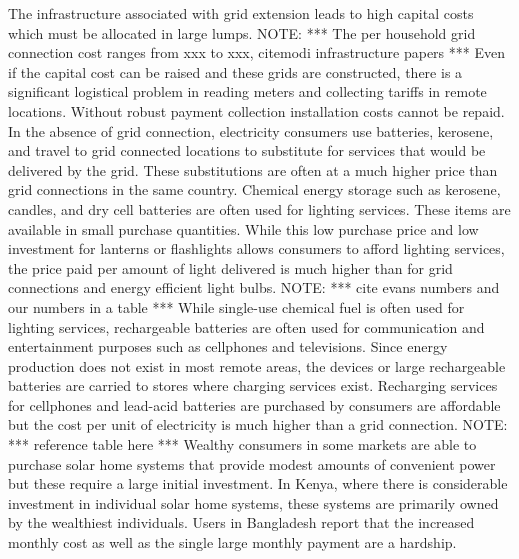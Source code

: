 \documentclass[conference]{IEEEtran}
\newcommand{\note}[1]{{\color{red} NOTE: *** #1 ***}}
\begin{document}
The infrastructure associated with grid extension leads to
high capital costs which must be allocated in large lumps.
\note{The per household grid connection cost ranges from
xxx to xxx, cite{modi infrastructure papers}}
\cite{ModiGeographyInfrastructure}
Even if the capital cost can be raised and these grids are 
constructed, there is a significant
logistical problem in reading meters and collecting tariffs
in remote locations.
Without robust payment collection installation costs cannot
be repaid.
In the absence of grid connection, electricity consumers use
batteries, kerosene, and travel to grid connected locations to
substitute for services that would be delivered by the grid.
These substitutions are often at a much higher price than grid
connections in the same country.
Chemical energy storage such as kerosene, candles, and dry cell batteries 
are often used for lighting services.
These items are available in small purchase quantities.
While this low purchase price and low investment for lanterns or
flashlights allows consumers to afford lighting services, the 
price paid per amount of light delivered is much higher than
for grid connections and energy efficient light bulbs.
\note{cite evans numbers and our numbers in a table}
While single-use chemical fuel is often used for lighting services, 
rechargeable batteries are often used for communication and 
entertainment purposes such as cellphones and televisions.
Since energy production does not exist in most remote areas, the 
devices or large rechargeable batteries are carried to stores
where charging services exist.
Recharging services for cellphones and lead-acid batteries are
purchased by consumers are affordable but the cost per unit of 
electricity is much higher than a grid connection.
\note{reference table here}
Wealthy consumers in some markets are able to purchase
solar home systems that provide modest amounts of convenient
power but these require a large initial investment.
In Kenya, where there is considerable investment in individual
solar home systems, these systems are primarily owned by the
wealthiest individuals.\cite{Jacobson:Connective}
Users in Bangladesh report that the increased monthly cost
as well as the single large monthly payment are a hardship.
\cite{Mondal:SHSBangladesh:2011}
\end{document}
